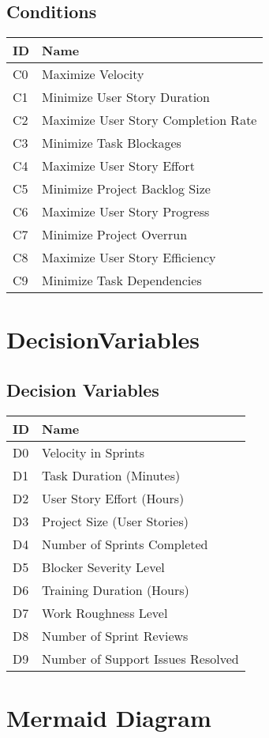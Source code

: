 \documentclass{article}
\begin{document}
\subsection{Conditions}
\begin{tabular}{|l|l|}
\hline
ID & Name \\
\hline
C0 & Maximize Velocity \\
C1 & Minimize User Story Duration \\
C2 & Maximize User Story Completion Rate \\
C3 & Minimize Task Blockages \\
C4 & Maximize User Story Effort \\
C5 & Minimize Project Backlog Size \\
C6 & Maximize User Story Progress \\
C7 & Minimize Project Overrun \\
C8 & Maximize User Story Efficiency \\
C9 & Minimize Task Dependencies \\
\hline
\end{tabular}

\section{DecisionVariables}
\subsection{Decision Variables}
\begin{tabular}{|l|l|}
\hline
ID & Name \\
\hline
D0 & Velocity in Sprints \\
D1 & Task Duration (Minutes) \\
D2 & User Story Effort (Hours) \\
D3 & Project Size (User Stories) \\
D4 & Number of Sprints Completed \\
D5 & Blocker Severity Level \\
D6 & Training Duration (Hours) \\
D7 & Work Roughness Level \\
D8 & Number of Sprint Reviews \\
D9 & Number of Support Issues Resolved \\
\hline
\end{tabular}

\section{Mermaid Diagram}
\begin{mermaid}
      
    
      
    
      
    
      
\end{mermaid}
\end{document}
